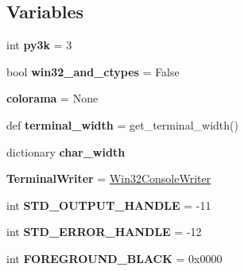 \subsection*{Variables}
\begin{DoxyCompactItemize}
\item 
\mbox{\label{namespacepy_1_1__io_1_1terminalwriter_aa8fc4d75aa359d287600e43541dcb0a7}} 
int {\bfseries py3k} = 3
\item 
\mbox{\label{namespacepy_1_1__io_1_1terminalwriter_a78011c5c7a1d504f0d006b3f8feba91d}} 
bool {\bfseries win32\+\_\+and\+\_\+ctypes} = False
\item 
\mbox{\label{namespacepy_1_1__io_1_1terminalwriter_adc0d9094972f889bc91cabea66c72841}} 
{\bfseries colorama} = None
\item 
\mbox{\label{namespacepy_1_1__io_1_1terminalwriter_a0bdaeee4d4cd57de2862c4003b207b46}} 
def {\bfseries terminal\+\_\+width} = get\+\_\+terminal\+\_\+width()
\item 
dictionary {\bfseries char\+\_\+width}
\item 
\mbox{\label{namespacepy_1_1__io_1_1terminalwriter_a0f79fca6b169a8e7589739e588a89cf5}} 
{\bfseries Terminal\+Writer} = \hyperlink{classpy_1_1__io_1_1terminalwriter_1_1_win32_console_writer}{Win32\+Console\+Writer}
\item 
\mbox{\label{namespacepy_1_1__io_1_1terminalwriter_ad5aa1d651e2c823d9957ebcb74947bf0}} 
int {\bfseries S\+T\+D\+\_\+\+O\+U\+T\+P\+U\+T\+\_\+\+H\+A\+N\+D\+LE} = -\/11
\item 
\mbox{\label{namespacepy_1_1__io_1_1terminalwriter_a0c1779f31b10828e5e5cb5f07756a0cf}} 
int {\bfseries S\+T\+D\+\_\+\+E\+R\+R\+O\+R\+\_\+\+H\+A\+N\+D\+LE} = -\/12
\item 
\mbox{\label{namespacepy_1_1__io_1_1terminalwriter_ac3f138b0284dcdbaf8c38a6c3c8b123a}} 
int {\bfseries F\+O\+R\+E\+G\+R\+O\+U\+N\+D\+\_\+\+B\+L\+A\+CK} = 0x0000

\end{DoxyCompactItemize}
